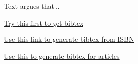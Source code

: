 \documentclass{uc-mse}
\begin{document}
Text \cite{Blanchard2005} argues that...

\citeauthor{Blanchard2005}

\citeyear{Blanchard2005}

\href{https://scholar.google.com/}{Try this first to get bibtex}

\href{https://www.bibtex.com/c/isbn-to-bibtex-converter/}{Use this link to generate bibtex from ISBN}


\href{https://www.bibme.org/bibtex}{Use this to generate bibtex for articles}



 
\end{document}
